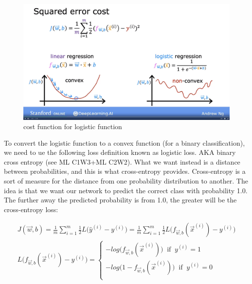 \documentclass[12pt]{report}
\begin{document}
\begin{figure}[htbp]
  \begin{center}
    \includegraphics[trim =0cm 6.0cm 0cm 20.0cm, clip, scale=0.15]{pics/logistic.png}
    \caption{cost function for logistic function}
  \end{center}
\end{figure}

To convert the logistic function to a convex function (for a binary classification), we need to ue the following loss definition known as logistic loss. AKA binary cross entropy (see ML C1W3+ML C2W2). What we want instead is a distance between probabilities, and this is what cross-entropy provides. Cross-entropy is a sort of measure for the distance from one probability distribution to another. The idea is that we want our network to predict the correct class with probability 1.0. The further away the predicted probability is from 1.0, the greater will be the cross-entropy loss:

\begin{multline}
J(\overrightarrow{w},b) = \frac{1}{m} \sum_{i=1}^{m} \frac{1}{2}  L\big(\hat{y}^{(i)}  - y^{(i)} \big) = \frac{1}{m} \sum_{i=1}^{m} \frac{1}{2}  L\big(f_{\overrightarrow{w},b} (\overrightarrow{x}^{(i)})   - y^{(i)} \big)\\
L\big(f_{\overrightarrow{w},b} (\overrightarrow{x}^{(i)})   - y^{(i)} \big) =
\begin{cases}
  -log\big( f_{\overrightarrow{w},b} (\overrightarrow{x}^{(i)}) \big)  \;\; \text{if} \;\; y^{(i)} = 1  \\
  -log\big(1-f_{\overrightarrow{w},b} (\overrightarrow{x}^{(i)}) \big)  \;\; \text{if} \;\; y^{(i)} = 0  \\
\end{cases}
\end{multline}
\end{document}
